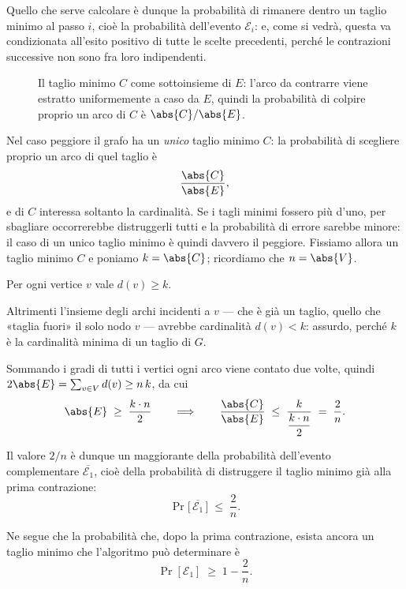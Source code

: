 Quello che serve calcolare è dunque la probabilità di rimanere dentro un taglio minimo al
passo $i$, cioè la probabilità dell'evento $\mathcal{E}_i$: e, come si vedrà, questa va
condizionata all'esito positivo di tutte le scelte precedenti, perché le contrazioni
successive non sono fra loro indipendenti.

\begin{figure}[H]
  \centering
  
  \caption{Il taglio minimo $C$ come sottoinsieme di $E$: l'arco da contrarre viene estratto
  uniformemente a caso da $E$, quindi la probabilità di colpire proprio un arco di $C$ è
  $\abs{C}/\abs{E}$.}
  \label{fig:mincut-c-in-e}
\end{figure}

Nel caso peggiore il grafo ha un \emph{unico} taglio minimo $C$: la probabilità di scegliere
proprio un arco di quel taglio è
\[
  \frac{\abs{C}}{\abs{E}} ,
\]
e di $C$ interessa soltanto la cardinalità. Se i tagli minimi fossero più d'uno, per
sbagliare occorrerebbe distruggerli tutti e la probabilità di errore sarebbe minore: il caso
di un unico taglio minimo è quindi davvero il peggiore. Fissiamo allora un taglio minimo $C$
e poniamo $k=\abs{C}$; ricordiamo che $n=\abs{V}$.

\begin{osservazione}
Per ogni vertice $v$ vale $d(v) \ge k$.

Altrimenti l'insieme degli archi incidenti a $v$ — che è già un taglio, quello che «taglia
fuori» il solo nodo $v$ — avrebbe cardinalità $d(v) < k$: assurdo, perché $k$ è la
cardinalità minima di un taglio di $G$.
\end{osservazione}

Sommando i gradi di tutti i vertici ogni arco viene contato due volte, quindi
$2\abs{E} = \sum_{v \in V} d(v) \ge n\,k$, da cui
\[
  \abs{E} \;\ge\; \frac{k \cdot n}{2}
  \qquad\Longrightarrow\qquad
  \frac{\abs{C}}{\abs{E}} \;\le\; \frac{k}{\dfrac{k \cdot n}{2}} \;=\; \frac{2}{n} .
\]

Il valore $2/n$ è dunque un maggiorante della probabilità dell'evento complementare
$\overline{\mathcal{E}_1}$, cioè della probabilità di distruggere il taglio minimo già alla
prima contrazione:
\[
  \Pr\bigl[\,\overline{\mathcal{E}_1}\,\bigr] \;\le\; \frac{2}{n} .
\]

Ne segue che la probabilità che, dopo la prima contrazione, esista ancora un taglio minimo
che l'algoritmo può determinare è
\[
  \Pr[\mathcal{E}_1] \;\ge\; 1-\frac{2}{n} .
\]

